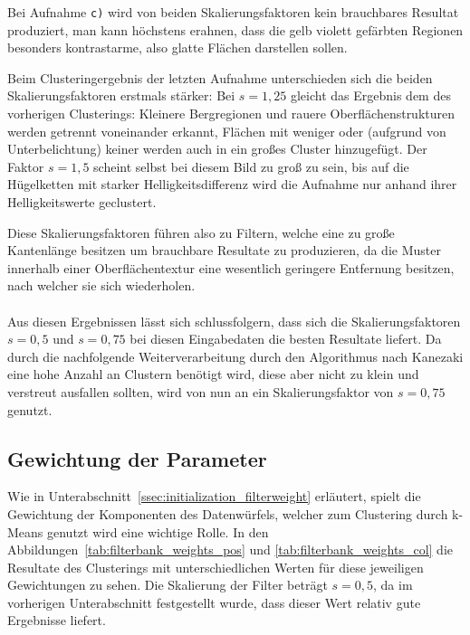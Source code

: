 Bei Aufnahme \texttt{c)} wird von beiden Skalierungsfaktoren kein brauchbares Resultat produziert, man kann höchstens erahnen, dass die gelb \bzw violett gefärbten Regionen besonders kontrastarme, also glatte Flächen darstellen sollen.

Beim Clusteringergebnis der letzten Aufnahme unterschieden sich die beiden Skalierungsfaktoren erstmals stärker: Bei $s=1,25$ gleicht das Ergebnis dem des vorherigen Clusterings: Kleinere Bergregionen und rauere Oberflächenstrukturen werden getrennt voneinander erkannt, Flächen mit weniger oder (aufgrund von Unterbelichtung) keiner werden auch in ein großes Cluster hinzugefügt. Der Faktor $s=1,5$ scheint selbst bei diesem Bild zu groß zu sein, bis auf die Hügelketten mit starker Helligkeitsdifferenz wird die Aufnahme nur anhand ihrer Helligkeitswerte geclustert.

Diese Skalierungsfaktoren führen also zu Filtern, welche eine zu große Kantenlänge besitzen um brauchbare Resultate zu produzieren, da die Muster innerhalb einer Oberflächentextur eine wesentlich geringere Entfernung besitzen, nach welcher sie sich wiederholen.

\paragraph{}
Aus diesen Ergebnissen lässt sich schlussfolgern, dass sich die Skalierungsfaktoren $s=0,5$ und $s=0,75$ bei diesen Eingabedaten die besten Resultate liefert. Da durch die nachfolgende Weiterverarbeitung durch den Algorithmus nach Kanezaki eine hohe Anzahl an Clustern benötigt wird, diese aber nicht zu klein und verstreut ausfallen sollten, wird von nun an ein Skalierungsfaktor von $s=0,75$ genutzt.

\subsection{Gewichtung der Parameter}
\label{ssec:exp_filterweight}

Wie in Unterabschnitt~\ref{ssec:initialization_filterweight} erläutert, spielt die Gewichtung der Komponenten des Datenwürfels, welcher zum Clustering durch k-Means genutzt wird eine wichtige Rolle. In den Abbildungen~\ref{tab:filterbank_weights_pos} und \ref{tab:filterbank_weights_col} die Resultate des Clusterings mit unterschiedlichen Werten für diese jeweiligen Gewichtungen zu sehen. Die Skalierung der Filter beträgt $s=0,5$, da im vorherigen Unterabschnitt festgestellt wurde, dass dieser Wert relativ gute Ergebnisse liefert.

